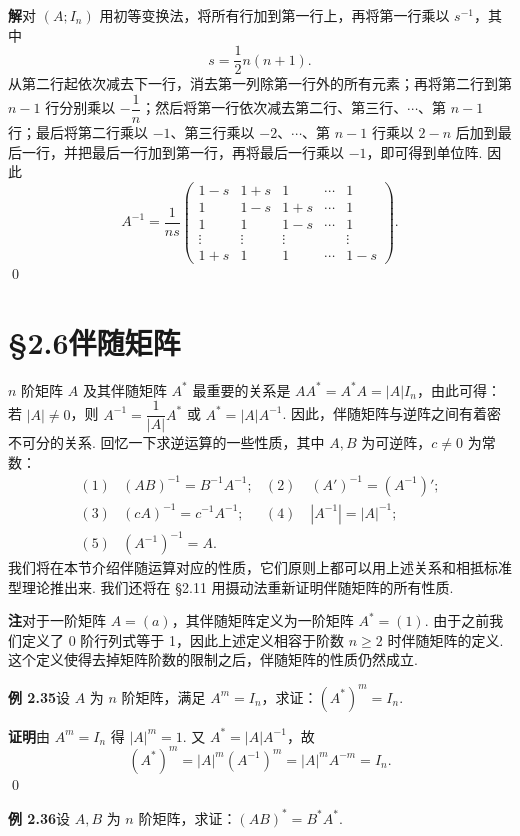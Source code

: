 \documentclass[UTF8,12pt,a4paper,fontset=fandol]{ctexart}
\begin{document}
\noindent\textbf{解}\quad 对 $(A;I_n)$ 用初等变换法，将所有行加到第一行上，再将第一行乘以 $s^{-1}$，其中
\[
s=\frac12 n(n+1).
\]
从第二行起依次减去下一行，消去第一列除第一行外的所有元素；再将第二行到第 $n-1$ 行分别乘以 $-\dfrac1n$；然后将第一行依次减去第二行、第三行、$\cdots$、第 $n-1$ 行；最后将第二行乘以 $-1$、第三行乘以 $-2$、$\cdots$、第 $n-1$ 行乘以 $2-n$ 后加到最后一行，并把最后一行加到第一行，再将最后一行乘以 $-1$，即可得到单位阵. 因此
\[
A^{-1}=\frac1{ns}
\left(
\begin{array}{ccccc}
1-s & 1+s & 1 & \cdots & 1\\
1 & 1-s & 1+s & \cdots & 1\\
1 & 1 & 1-s & \cdots & 1\\
\vdots & \vdots & \vdots & & \vdots\\
1+s & 1 & 1 & \cdots & 1-s
\end{array}
\right).
\]
\qed

\section*{§2.6\quad 伴随矩阵}

$n$ 阶矩阵 $A$ 及其伴随矩阵 $A^*$ 最重要的关系是 $AA^*=A^*A=|A|I_n$，由此可得：若 $|A|\ne0$，则 $A^{-1}=\dfrac1{|A|}A^*$ 或 $A^*=|A|A^{-1}$. 因此，伴随矩阵与逆阵之间有着密不可分的关系. 回忆一下求逆运算的一些性质，其中 $A,B$ 为可逆阵，$c\ne0$ 为常数：
\[
\begin{array}{lll}
(1) & (AB)^{-1}=B^{-1}A^{-1}; &
(2)\quad (A')^{-1}=(A^{-1})';\\
(3) & (cA)^{-1}=c^{-1}A^{-1}; &
(4)\quad |A^{-1}|=|A|^{-1};\\
(5) & (A^{-1})^{-1}=A.
\end{array}
\]
我们将在本节介绍伴随运算对应的性质，它们原则上都可以用上述关系和相抵标准型理论推出来. 我们还将在 §2.11 用摄动法重新证明伴随矩阵的所有性质.

\noindent\textbf{注}\quad 对于一阶矩阵 $A=(a)$，其伴随矩阵定义为一阶矩阵 $A^*=(1)$. 由于之前我们定义了 0 阶行列式等于 1，因此上述定义相容于阶数 $n\ge2$ 时伴随矩阵的定义. 这个定义使得去掉矩阵阶数的限制之后，伴随矩阵的性质仍然成立.

\noindent\textbf{例 2.35}\quad 设 $A$ 为 $n$ 阶矩阵，满足 $A^m=I_n$，求证：$(A^*)^m=I_n$.

\noindent\textbf{证明}\quad 由 $A^m=I_n$ 得 $|A|^m=1$. 又 $A^*=|A|A^{-1}$，故
\[
(A^*)^m=|A|^m(A^{-1})^m=|A|^mA^{-m}=I_n.
\]
\qed

\noindent\textbf{例 2.36}\quad 设 $A,B$ 为 $n$ 阶矩阵，求证：$(AB)^*=B^*A^*$.
\end{document}
